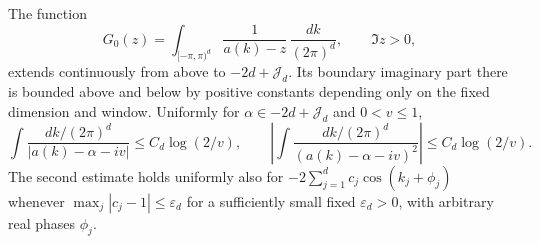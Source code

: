 \begin{lemma}
\label{lem:initial-bottom-density}
The function
\[
 G_0(z)=\int_{[-\pi,\pi)^d}\frac{1}{a(k)-z}\,
                    \frac{dk}{(2\pi)^d},\qquad \Im z>0,
\]
extends continuously from above to $-2d+\mathcal J_d$. Its boundary imaginary
part there is bounded above and below by positive constants depending
only on the fixed dimension and window. Uniformly for
$\alpha\in-2d+\mathcal J_d$ and $0<v\le1$,
\begin{equation}\label{eq:initial-density-integrals}
 \int\frac{dk/(2\pi)^d}{|a(k)-\alpha-iv|}
       \le C_d\log(2/v),
 \qquad
 \left|\int\frac{dk/(2\pi)^d}{(a(k)-\alpha-iv)^2}\right|
       \le C_d\log(2/v).
\end{equation}
The second estimate holds uniformly also for
$-2\sum_{j=1}^dc_j\cos(k_j+\phi_j)$ whenever
$\max_j|c_j-1|\le\varepsilon_d$ for a sufficiently small fixed
$\varepsilon_d>0$, with arbitrary real phases $\phi_j$.
\end{lemma}

